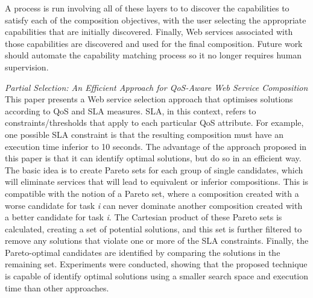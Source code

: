 A process is run involving all of these layers to to discover the capabilities to satisfy each of the composition objectives, with the user selecting
the appropriate capabilities that are initially discovered. Finally, Web services associated with those capabilities are discovered and used for the
final composition. Future work should automate the capability matching process so it no longer requires human supervision.

\textit{Partial Selection: An Efficient Approach for QoS-Aware Web Service Composition \cite{chen2014partial}}\\
This paper presents a Web service selection approach that optimises solutions according to QoS and SLA measures. SLA, in this context, refers to constraints/thresholds that apply to each particular QoS attribute. For example, one possible SLA constraint is that the resulting composition must have an execution time inferior to 10 seconds. The advantage of the approach proposed in this paper is that it can identify optimal solutions, but do so in an efficient way. The basic idea is to create Pareto sets for each group of single candidates, which will eliminate services that will lead to equivalent or inferior compositions. This is compatible with the notion of a Pareto set, where a composition created with a worse candidate for task \textit{i} can never dominate another composition created with a better candidate for task \textit{i}. The Cartesian product of these Pareto sets is calculated, creating a set of potential solutions, and this set is further filtered to remove any solutions that violate one or more of the SLA constraints. Finally, the Pareto-optimal candidates are identified by comparing the solutions in the remaining set. Experiments were conducted, showing that the proposed technique is capable of identify optimal solutions using a smaller search space and execution time than other approaches.

